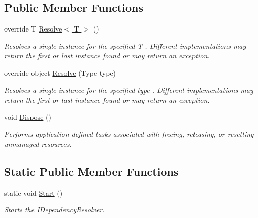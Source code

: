 \subsection*{Public Member Functions}
\begin{DoxyCompactItemize}
\item 
override T \hyperlink{classCqrs_1_1Configuration_1_1SampleRuntime_1_1MockDependencyResolver_a8f91ae00213bf65aa3349a7dcd82d24d_a8f91ae00213bf65aa3349a7dcd82d24d}{Resolve$<$ T $>$} ()
\begin{DoxyCompactList}\small\item\em Resolves a single instance for the specified {\itshape T} . Different implementations may return the first or last instance found or may return an exception. \end{DoxyCompactList}\item 
override object \hyperlink{classCqrs_1_1Configuration_1_1SampleRuntime_1_1MockDependencyResolver_ac4e52e995e2f8ff243d2af624d229461_ac4e52e995e2f8ff243d2af624d229461}{Resolve} (Type type)
\begin{DoxyCompactList}\small\item\em Resolves a single instance for the specified {\itshape type} . Different implementations may return the first or last instance found or may return an exception. \end{DoxyCompactList}\item 
void \hyperlink{classCqrs_1_1Configuration_1_1SampleRuntime_1_1MockDependencyResolver_a65e8da6993b4917c7ddefb92e4bd27ed_a65e8da6993b4917c7ddefb92e4bd27ed}{Dispose} ()
\begin{DoxyCompactList}\small\item\em Performs application-\/defined tasks associated with freeing, releasing, or resetting unmanaged resources. \end{DoxyCompactList}\end{DoxyCompactItemize}
\subsection*{Static Public Member Functions}
\begin{DoxyCompactItemize}
\item 
static void \hyperlink{classCqrs_1_1Configuration_1_1SampleRuntime_1_1MockDependencyResolver_a01bee8933ae869c67100d92e4b84ba85_a01bee8933ae869c67100d92e4b84ba85}{Start} ()
\begin{DoxyCompactList}\small\item\em Starts the \hyperlink{interfaceCqrs_1_1Configuration_1_1IDependencyResolver}{I\+Dependency\+Resolver}. \end{DoxyCompactList}\end{DoxyCompactItemize}
